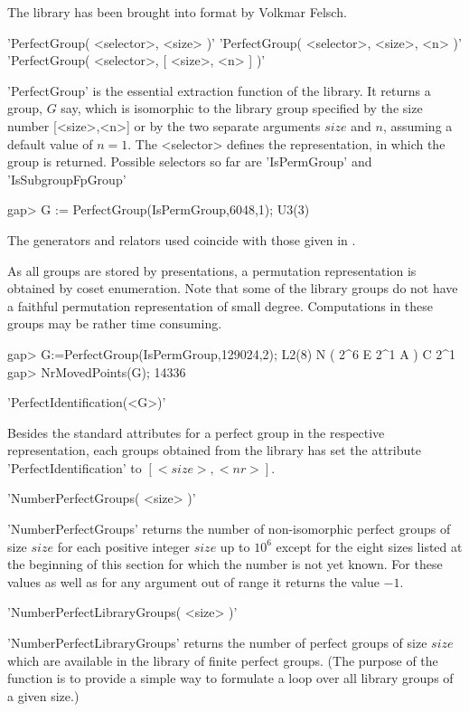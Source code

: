 The library has been brought into {\GAP} format by Volkmar Felsch.

\>'PerfectGroup( <selector>, <size> )'
\>'PerfectGroup( <selector>, <size>, <n> )'
\>'PerfectGroup( <selector>, [ <size>, <n> ] )'

'PerfectGroup' is the  essential extraction function  of the library.  It
returns a group, $G$  say, which is isomorphic to the
library  group specified  by the size  number  [<size>,<n>] or by the two
separate arguments  $size$ and $n$, assuming a default value of $n = 1$.
The <selector> defines the representation, in which the group is returned.
Possible selectors so far are 'IsPermGroup' and 'IsSubgroupFpGroup'

\beginexample
gap> G := PerfectGroup(IsPermGroup,6048,1);  
U3(3)
\endexample

The  generators and  relators used coincide  with  those  given  in
\cite{HP89}.

As all groups are stored by presentations, a permutation representation is
obtained by coset enumeration. Note that some of the  library groups do not
have a faithful permutation representation of  small  degree. Computations
in  these groups  may  be rather time consuming.

\beginexample
gap> G:=PerfectGroup(IsPermGroup,129024,2);
L2(8) N ( 2^6 E 2^1 A ) C 2^1
gap> NrMovedPoints(G);
14336
\endexample

\>'PerfectIdentification(<G>)'

Besides the standard attributes for a perfect group in the respective
representation, each groups obtained from the library has set the attribute
'PerfectIdentification' to $[<size>,<nr>]$.

\>'NumberPerfectGroups( <size> )'%

'NumberPerfectGroups' returns the number of non-isomorphic perfect groups
of size $size$ for  each positive integer  $size$ up to $10^6$ except for
the eight  sizes listed at the beginning  of  this section for  which the
number is not yet known. For these values as well as for any argument out
of range it returns the value $-1$.

\>'NumberPerfectLibraryGroups( <size> )'%

'NumberPerfectLibraryGroups' returns the number of perfect groups of size
$size$ which are available in the library of finite perfect groups.
(The purpose  of the  function  is  to  provide  a simple  way  to
formulate a loop over all library groups of a given size.)

